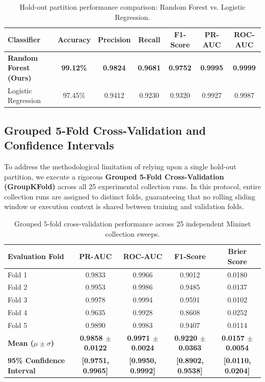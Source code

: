 \begin{table}[H]
  \centering
  \small
  \caption{Hold-out partition performance comparison: Random Forest vs. Logistic Regression.}
  \label{tab:model_performance}
  \begin{tabular}{l c c c c c c}
    \toprule
    \textbf{Classifier} & \textbf{Accuracy} & \textbf{Precision} & \textbf{Recall} & \textbf{F1-Score} & \textbf{PR-AUC} & \textbf{ROC-AUC} \\
    \midrule
    \textbf{Random Forest (Ours)} & \textbf{99.12\%} & \textbf{0.9824} & \textbf{0.9681} & \textbf{0.9752} & \textbf{0.9995} & \textbf{0.9999} \\
    Logistic Regression & 97.45\% & 0.9412 & 0.9230 & 0.9320 & 0.9927 & 0.9987 \\
    \bottomrule
  \end{tabular}
\end{table}

\subsection{Grouped 5-Fold Cross-Validation and Confidence Intervals}
To address the methodological limitation of relying upon a single hold-out partition, we execute a rigorous \textbf{Grouped 5-Fold Cross-Validation (GroupKFold)} across all 25 experimental collection runs. In this protocol, entire collection runs are assigned to distinct folds, guaranteeing that no rolling sliding window or execution context is shared between training and validation folds.

\begin{table}[H]
  \centering
  \small
  \caption{Grouped 5-fold cross-validation performance across 25 independent Mininet collection sweeps.}
  \label{tab:grouped_cv_results}
  \begin{tabular}{l c c c c}
    \toprule
    \textbf{Evaluation Fold} & \textbf{PR-AUC} & \textbf{ROC-AUC} & \textbf{F1-Score} & \textbf{Brier Score} \\
    \midrule
    Fold 1 & 0.9833 & 0.9966 & 0.9012 & 0.0180 \\
    Fold 2 & 0.9953 & 0.9986 & 0.9485 & 0.0137 \\
    Fold 3 & 0.9978 & 0.9994 & 0.9591 & 0.0102 \\
    Fold 4 & 0.9635 & 0.9928 & 0.8608 & 0.0252 \\
    Fold 5 & 0.9890 & 0.9983 & 0.9407 & 0.0114 \\
    \midrule
    \textbf{Mean ($\mu \pm \sigma$)} & \textbf{0.9858 $\pm$ 0.0122} & \textbf{0.9971 $\pm$ 0.0024} & \textbf{0.9220 $\pm$ 0.0363} & \textbf{0.0157 $\pm$ 0.0054} \\
    \textbf{95\% Confidence Interval} & \textbf{[0.9751, 0.9965]} & \textbf{[0.9950, 0.9992]} & \textbf{[0.8902, 0.9538]} & \textbf{[0.0110, 0.0204]} \\
    \bottomrule
  \end{tabular}
\end{table}

